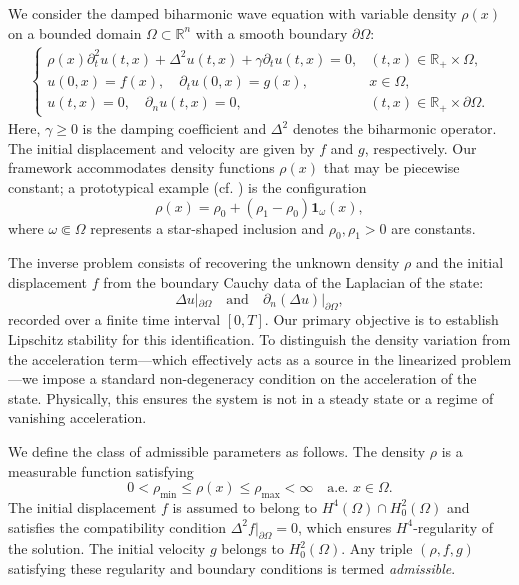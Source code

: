 \documentclass[12pt,reqno]{amsart}
\numberwithin{equation}{section}
\begin{document}
	We consider the damped biharmonic wave equation with variable density $\rho(x)$ on a bounded domain $\Omega \subset \mathbb{R}^n$ with a smooth boundary $\partial\Omega$:
	\begin{align}\label{a}
		\begin{cases}
			\rho(x) \partial_t^2 u(t, x) + \Delta^2 u(t, x) + \gamma \partial_t u(t, x) = 0, & (t, x) \in \mathbb{R}_+ \times \Omega, \\[6pt]
			u(0, x) = f(x), \quad \partial_t u(0, x) = g(x), & x \in \Omega, \\[6pt]
			u(t, x) = 0, \quad \partial_n u(t, x) = 0, & (t, x) \in \mathbb{R}_+ \times \partial \Omega.
		\end{cases}
	\end{align}
	Here, $\gamma \ge 0$ is the damping coefficient and $\Delta^2$ denotes the biharmonic operator. The initial displacement and velocity are given by $f$ and $g$, respectively. Our framework accommodates density functions $\rho(x)$ that may be piecewise constant; a prototypical example (cf. \cite{Faouzi2025}) is the configuration
	\[
	\rho(x) = \rho_0 + (\rho_1 - \rho_0) \mathbf{1}_{\omega}(x),
	\]
	where $\omega \Subset \Omega$ represents a star-shaped inclusion and $\rho_0, \rho_1 > 0$ are constants.
	
	The inverse problem consists of recovering the unknown density $\rho$ and the initial displacement $f$ from the boundary Cauchy data of the Laplacian of the state:
	\[
	\Delta u|_{\partial \Omega} \quad \text{and} \quad \partial_n(\Delta u)|_{\partial \Omega},
	\]
	recorded over a finite time interval $[0, T]$. Our primary objective is to establish Lipschitz stability for this identification. To distinguish the density variation from the acceleration term—which effectively acts as a source in the linearized problem—we impose a standard non-degeneracy condition on the acceleration of the state. Physically, this ensures the system is not in a steady state or a regime of vanishing acceleration.
	
	We define the class of admissible parameters as follows. The density $\rho$ is a measurable function satisfying 
	\[ 0 < \rho_{\min} \le \rho(x) \le \rho_{\max} < \infty \quad \text{a.e. } x \in \Omega. \]
	The initial displacement $f$ is assumed to belong to $H^{4}(\Omega) \cap H^{2}_{0}(\Omega)$ and satisfies the compatibility condition $\Delta^{2}f|_{\partial\Omega}=0$, which ensures $H^4$-regularity of the solution. The initial velocity $g$ belongs to $H^{2}_{0}(\Omega)$. Any triple $(\rho, f, g)$ satisfying these regularity and boundary conditions is termed \emph{admissible}.
	
\end{document}

